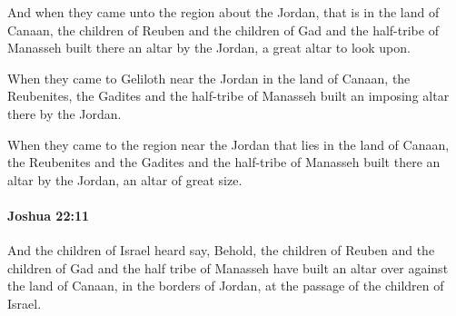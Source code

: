 			\begin{versebox}
					\item[BHS] 
					\item[ASV] And when they came unto the region about the Jordan, that is in the land of Canaan, the children of Reuben and the children of Gad and the half-tribe of Manasseh built there an altar by the Jordan, a great altar to look upon.
					\item[NIV] When they came to Geliloth near the Jordan in the land of Canaan, the Reubenites, the Gadites and the half-tribe of Manasseh built an imposing altar there by the Jordan.
					\item[NRSV] When they came to the region near the Jordan that lies in the land of Canaan, the Reubenites and the Gadites and the half-tribe of Manasseh built there an altar by the Jordan, an altar of great size.
			\end{versebox}

		\paragraph{Joshua 22:11} %
			\label{JOSHUA-22-11}

			And the children of Israel heard say, Behold, the children of Reuben and the children of Gad and the half tribe of Manasseh have built an altar over against the land of Canaan, in the borders of Jordan, at the passage of the children of Israel.

